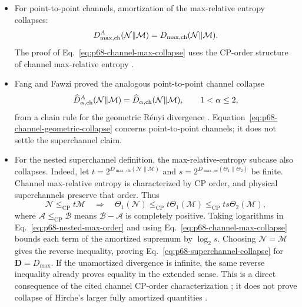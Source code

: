 \begin{itemize}
  \item For point-to-point channels, amortization of the max-relative entropy
  collapses:
  \begin{equation}
    D_{\max,{\rm ch}}^{A}(\mathcal N\|\mathcal M)
    =D_{\max,{\rm ch}}(\mathcal N\|\mathcal M).
    \label{eq:p68-channel-max-collapse}
  \end{equation}
  The proof of Eq.~\eqref{eq:p68-channel-max-collapse} uses the CP-order
  structure of channel max-relative entropy
  .

  \item Fang and Fawzi proved the analogous point-to-point channel collapse
  \begin{equation}
    \widehat D_{\alpha,{\rm ch}}^{A}(\mathcal N\|\mathcal M)
    =\widehat D_{\alpha,{\rm ch}}(\mathcal N\|\mathcal M),
    \qquad 1<\alpha\leq2,
    \label{eq:p68-channel-geometric-collapse}
  \end{equation}
  from a chain rule for the geometric R\'enyi divergence
  .
Equation~\eqref{eq:p68-channel-geometric-collapse} concerns point-to-point
channels; it does not settle the superchannel claim.

  \item For the nested superchannel definition, the max-relative-entropy
subcase also collapses. Indeed, let
$t=2^{D_{\max,\mathrm{ch}}(\mathcal N\|\mathcal M)}$ and
$s=2^{D_{\max,\mathrm{sc}}(\Theta_1\|\Theta_2)}$ be finite.
Channel max-relative entropy is characterized by CP order, and physical
superchannels preserve that order. Thus
\begin{equation}
  \mathcal N\leq_{\mathrm{CP}}t\mathcal M
  \quad\Longrightarrow\quad
  \Theta_1(\mathcal N)\leq_{\mathrm{CP}}t\Theta_1(\mathcal M)
    \leq_{\mathrm{CP}}ts\Theta_2(\mathcal M),
  \label{eq:p68-nested-max-order}
\end{equation}
where $\mathcal A\leq_{\mathrm{CP}}\mathcal B$ means
$\mathcal B-\mathcal A$ is completely positive.
Taking logarithms in Eq.~\eqref{eq:p68-nested-max-order} and using
Eq.~\eqref{eq:p68-channel-max-collapse} bounds each term of the amortized
supremum by $\log_2s$. Choosing $\mathcal N=\mathcal M$ gives the reverse
inequality, proving Eq.~\eqref{eq:p68-superchannel-collapse} for
$\mathbf D=D_{\max}$. If the unamortized divergence is infinite, the same
reverse inequality already proves equality in the extended sense.
This is a direct consequence of the cited channel CP-order characterization
; it does not prove
collapse of Hirche's larger fully amortized quantities
.


\end{itemize}
